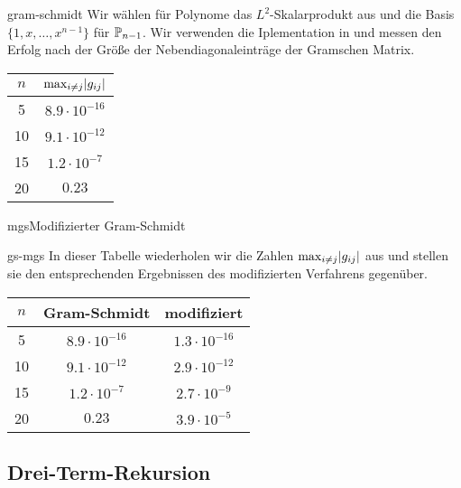 \begin{Beispiel}{gram-schmidt}
  Wir wählen für Polynome das $L^2$-Skalarprodukt aus
   und die Basis $\{1,x,\dots,x^{n-1}\}$
  für $\P_{n-1}$. Wir verwenden die Iplementation in
   und messen den Erfolg nach der
  Größe der Nebendiagonaleinträge der Gramschen Matrix.
  \begin{center}
    \begin{tabular}{c|c}
      $n$ & $\max_{i\neq j} \abs{g_{ij}}$ \\
      \hline
      5 & $8.9\cdot 10^{-16}$ \\
      10 & $9.1\cdot 10^{-12}$ \\
      15 & $1.2\cdot 10^{-7}$ \\
      20 & $0.23$
    \end{tabular}
  \end{center}
\end{Beispiel}

\begin{Algorithmus*}{mgs}{Modifizierter Gram-Schmidt}
    
\end{Algorithmus*}

\begin{Beispiel}{gs-mgs}
  In dieser Tabelle wiederholen wir die Zahlen $\max_{i\neq j} \abs{g_{ij}}$ aus
   und stellen sie den entsprechenden
  Ergebnissen des modifizierten Verfahrens gegenüber.
  \begin{center}
    \begin{tabular}{c|cc}
      $n$ &  Gram-Schmidt & modifiziert\\
      \hline
      5 & $8.9\cdot 10^{-16}$ & $1.3\cdot 10^{-16}$ \\
      10 & $9.1\cdot 10^{-12}$ & $2.9\cdot 10^{-12}$ \\
      15 & $1.2\cdot 10^{-7}$ & $2.7\cdot 10^{-9}$ \\
      20 & $0.23$ & $3.9\cdot 10^{-5}$
    \end{tabular}
  \end{center}
\end{Beispiel}

\subsection{Drei-Term-Rekursion}

